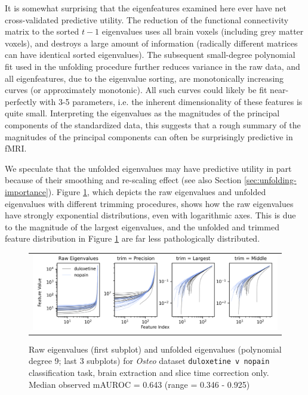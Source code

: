 \documentclass[12pt]{spieman}  %
\begin{document}
\begin{spacing}{2}
It is somewhat surprising that the eigenfeatures examined here ever have net
cross-validated predictive utility. The reduction of the functional
connectivity matrix to the sorted \(t - 1\) eigenvalues uses all brain voxels
(including grey matter voxels), and destroys a large amount of information
(radically different matrices can have identical sorted eigenvalues). The
subsequent small-degree polynomial fit used in the unfolding procedure further
reduces variance in the raw data, and all eigenfeatures, due to the eigenvalue
sorting, are monotonically increasing curves (or approximately monotonic). All
such curves could likely be fit near-perfectly with 3-5 parameters, i.e. the
inherent dimensionality of these features is quite small. Interpreting the
eigenvalues as the magnitudes of the principal components of the standardized
data, this suggests that a rough summary of the magnitudes of the principal
components can often be surprisingly predictive in fMRI.

We speculate that the unfolded eigenvalues may have predictive utility in part
because of their smoothing and re-scaling effect (see also Section
\ref{sec:unfolding-importance}). Figure \ref{fig:unfolded}, which depicts the
raw eigenvalues and unfolded eigenvalues with different trimming procedures,
shows how the raw eigenvalues have strongly exponential distributions, even
with logarithmic axes. This is due to the magnitude of the largest eigenvalues,
and the unfolded and trimmed feature distribution in Figure \ref{fig:unfolded}
are far less pathologically distributed.

\begin{figure}
\begin{center}
\begin{tabular}{c}
\includegraphics[width=6.5in]{unfolded_osteo_duloxetine_v_nopain.png}
\end{tabular}
\end{center}
\caption
{ \label{fig:unfolded} Raw eigenvalues (first subplot) and unfolded eigenvalues
(polynomial degree 9; last 3 subplots) for \textit{Osteo} dataset
\footnotesize\texttt{duloxetine v nopain} classification task, brain extraction
and slice time correction only. Median observed mAUROC = 0.643 (range = 0.346 -
0.925)}
\end{figure}


\end{spacing}
\end{document}
